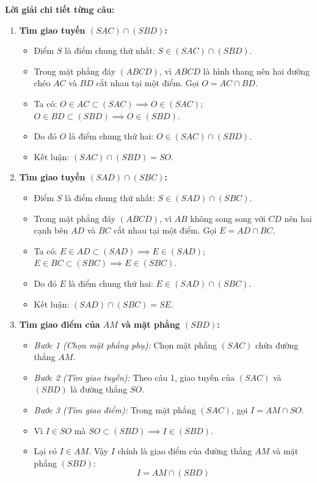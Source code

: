 \documentclass[12pt, a4paper]{article}
\begin{document}
\textbf{Lời giải chi tiết từng câu:}
\begin{enumerate}[leftmargin=0.6cm]
    \item \textbf{Tìm giao tuyến $(SAC) \cap (SBD)$:}
    \begin{itemize}
        \item Điểm $S$ là điểm chung thứ nhất: $S \in (SAC) \cap (SBD)$.
        \item Trong mặt phẳng đáy $(ABCD)$, vì $ABCD$ là hình thang nên hai đường chéo $AC$ và $BD$ cắt nhau tại một điểm. Gọi $O = AC \cap BD$.
        \item Ta có: $O \in AC \subset (SAC) \implies O \in (SAC)$; $O \in BD \subset (SBD) \implies O \in (SBD)$.
        \item Do đó $O$ là điểm chung thứ hai: $O \in (SAC) \cap (SBD)$.
        \item Kết luận: $(SAC) \cap (SBD) = SO$.
    \end{itemize}

    \item \textbf{Tìm giao tuyến $(SAD) \cap (SBC)$:}
    \begin{itemize}
        \item Điểm $S$ là điểm chung thứ nhất: $S \in (SAD) \cap (SBC)$.
        \item Trong mặt phẳng đáy $(ABCD)$, vì $AB$ không song song với $CD$ nên hai cạnh bên $AD$ và $BC$ cắt nhau tại một điểm. Gọi $E = AD \cap BC$.
        \item Ta có: $E \in AD \subset (SAD) \implies E \in (SAD)$; $E \in BC \subset (SBC) \implies E \in (SBC)$.
        \item Do đó $E$ là điểm chung thứ hai: $E \in (SAD) \cap (SBC)$.
        \item Kết luận: $(SAD) \cap (SBC) = SE$.
    \end{itemize}

    \item \textbf{Tìm giao điểm của $AM$ và mặt phẳng $(SBD)$:}
    \begin{itemize}
        \item \textit{Bước 1 (Chọn mặt phẳng phụ):} Chọn mặt phẳng $(SAC)$ chứa đường thẳng $AM$.
        \item \textit{Bước 2 (Tìm giao tuyến):} Theo câu 1, giao tuyến của $(SAC)$ và $(SBD)$ là đường thẳng $SO$.
        \item \textit{Bước 3 (Tìm giao điểm):} Trong mặt phẳng $(SAC)$, gọi $I = AM \cap SO$.
        \item Vì $I \in SO$ mà $SO \subset (SBD) \implies I \in (SBD)$.
        \item Lại có $I \in AM$. Vậy $I$ chính là giao điểm của đường thẳng $AM$ và mặt phẳng $(SBD)$:
        $$I = AM \cap (SBD)$$
    \end{itemize}
\end{enumerate}
\end{document}
